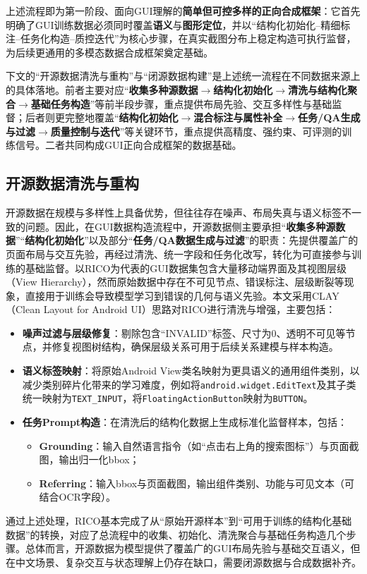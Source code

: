 上述流程即为第一阶段、面向GUI理解的\textbf{简单但可控多样的正向合成框架}：它首先明确了GUI训练数据必须同时覆盖\textbf{语义}与\textbf{图形定位}，并以“结构化初始化--精细标注--任务化构造--质控迭代”为核心步骤，在真实截图分布上稳定构造可执行监督，为后续更通用的多模态数据合成框架奠定基础。

下文的“开源数据清洗与重构”与“闭源数据构建”是上述统一流程在不同数据来源上的具体落地。前者主要对应“\textbf{收集多种源数据$\rightarrow$结构化初始化$\rightarrow$清洗与结构化聚合$\rightarrow$基础任务构造}”等前半段步骤，重点提供布局先验、交互多样性与基础监督；后者则更完整地覆盖“\textbf{结构化初始化$\rightarrow$混合标注与属性补全$\rightarrow$任务/QA生成与过滤$\rightarrow$质量控制与迭代}”等关键环节，重点提供高精度、强约束、可评测的训练信号。二者共同构成GUI正向合成框架的数据基础。

\subsection{开源数据清洗与重构}
开源数据在规模与多样性上具备优势，但往往存在噪声、布局失真与语义标签不一致的问题。因此，在GUI数据构造流程中，开源数据侧主要承担“\textbf{收集多种源数据}”“\textbf{结构化初始化}”以及部分“\textbf{任务/QA数据生成与过滤}”的职责：先提供覆盖广的页面布局与交互先验，再经过清洗、统一字段和任务化改写，转化为可直接参与训练的基础监督。以RICO为代表的GUI数据集\citep{deka2017rico}包含大量移动端界面及其视图层级（View Hierarchy），然而原始数据中存在不可见节点、错误标注、层级断裂等现象，直接用于训练会导致模型学习到错误的几何与语义先验。本文采用CLAY（Clean Layout for Android UI）思路对RICO进行清洗与增强\citep{li2022clay}，主要包括：
\begin{itemize}
  \item \textbf{噪声过滤与层级修复}：剔除包含“INVALID”标签、尺寸为0、透明不可见等节点，并修复视图树结构，确保层级关系可用于后续关系建模与样本构造。
  \item \textbf{语义标签映射}：将原始Android View类名映射为更具语义的通用组件类别，以减少类别碎片化带来的学习难度，例如将\texttt{android.widget.\allowbreak EditText}及其子类统一映射为\texttt{TEXT\_INPUT}，将\texttt{FloatingActionButton}映射为\texttt{BUTTON}。
  \item \textbf{任务Prompt构造}：在清洗后的结构化数据上生成标准化监督样本，包括：
    \begin{itemize}
      \item \textbf{Grounding}：输入自然语言指令（如“点击右上角的搜索图标”）与页面截图，输出归一化bbox；
      \item \textbf{Referring}：输入bbox与页面截图，输出组件类别、功能与可见文本（可结合OCR字段）。
    \end{itemize}
\end{itemize}
通过上述处理，RICO基本完成了从“原始开源样本”到“可用于训练的结构化基础数据”的转换，对应了总流程中的收集、初始化、清洗聚合与基础任务构造几个步骤。总体而言，开源数据为模型提供了覆盖广的GUI布局先验与基础交互语义，但在中文场景、复杂交互与状态理解上仍存在缺口，需要闭源数据与合成数据补齐。

